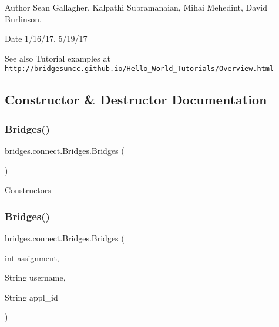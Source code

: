 \begin{DoxyAuthor}{Author}
Sean Gallagher, Kalpathi Subramanaian, Mihai Mehedint, David Burlinson.
\end{DoxyAuthor}
\begin{DoxyDate}{Date}
1/16/17, 5/19/17
\end{DoxyDate}
\begin{DoxySeeAlso}{See also}
Tutorial examples at ~\newline
 \href{http://bridgesuncc.github.io/Hello_World_Tutorials/Overview.html}{\tt http\+://bridgesuncc.\+github.\+io/\+Hello\+\_\+\+World\+\_\+\+Tutorials/\+Overview.\+html} 
\end{DoxySeeAlso}


\subsection{Constructor \& Destructor Documentation}
\mbox{\label{classbridges_1_1connect_1_1_bridges_a42f0592841a829f93453506c78951b1f}} 
\subsubsection{\texorpdfstring{Bridges()}{Bridges()}\hspace{0.1cm}{\footnotesize\ttfamily [1/2]}}
{\footnotesize\ttfamily bridges.\+connect.\+Bridges.\+Bridges (\begin{DoxyParamCaption}{ }\end{DoxyParamCaption})}

Constructors \mbox{\label{classbridges_1_1connect_1_1_bridges_a4c47eb7cbb94c5810dc38c38760db872}} 
\subsubsection{\texorpdfstring{Bridges()}{Bridges()}\hspace{0.1cm}{\footnotesize\ttfamily [2/2]}}
{\footnotesize\ttfamily bridges.\+connect.\+Bridges.\+Bridges (\begin{DoxyParamCaption}\item[{int}]{assignment,  }\item[{String}]{username,  }\item[{String}]{appl\+\_\+id }\end{DoxyParamCaption})}

